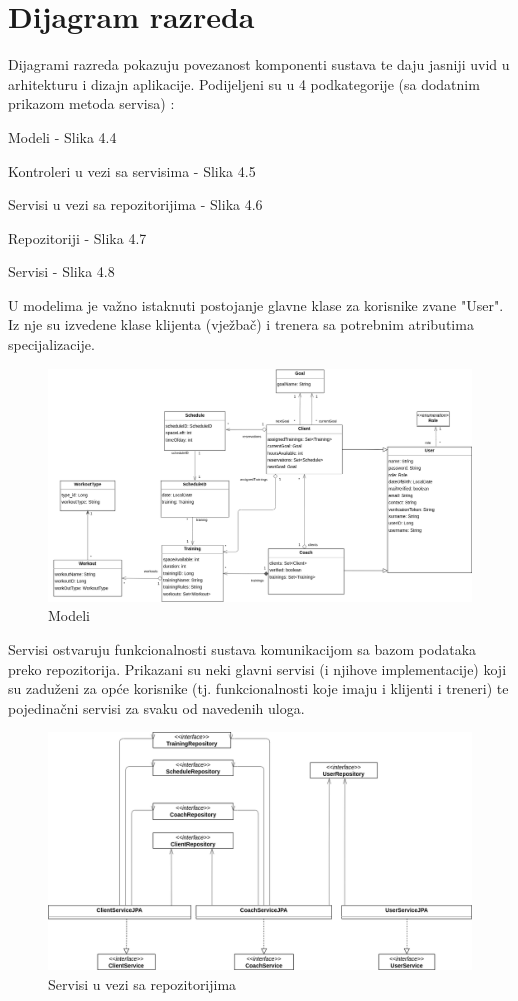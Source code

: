 	\section{Dijagram razreda}
		\noindent Dijagrami razreda pokazuju povezanost komponenti sustava te daju jasniji uvid u arhitekturu i dizajn aplikacije. Podijeljeni su u 4 podkategorije (sa dodatnim prikazom metoda servisa) :
		 \begin{packed_item}    
			\item Modeli - Slika 4.4
			\item Kontroleri u vezi sa servisima - Slika 4.5
			\item Servisi u vezi sa repozitorijima - Slika 4.6                
			\item Repozitoriji - Slika 4.7
                \item Servisi - Slika 4.8
		
		\end{packed_item}
		\noindent U modelima je važno istaknuti postojanje glavne klase za korisnike zvane "User". Iz nje su izvedene klase klijenta (vježbač) i trenera sa potrebnim atributima specijalizacije.
		\begin{figure}[H]
		\includegraphics[scale=0.425]{./Dijagrami/domain.png}
		\centering
		\caption{Modeli}
		\label{fig:promjene}
	\end{figure}
    \noindent Servisi ostvaruju funkcionalnosti sustava komunikacijom sa bazom podataka preko repozitorija. Prikazani su neki glavni servisi (i njihove implementacije) koji su zaduženi za opće korisnike (tj. funkcionalnosti koje imaju i klijenti i treneri) te pojedinačni servisi za svaku od navedenih uloga.
	\begin{figure}[H]
		\includegraphics[scale=0.425]{./Dijagrami/services_repositories.png}
		\centering
		\caption{Servisi u vezi sa repozitorijima}
		\label{fig:promjene}
	\end{figure}
